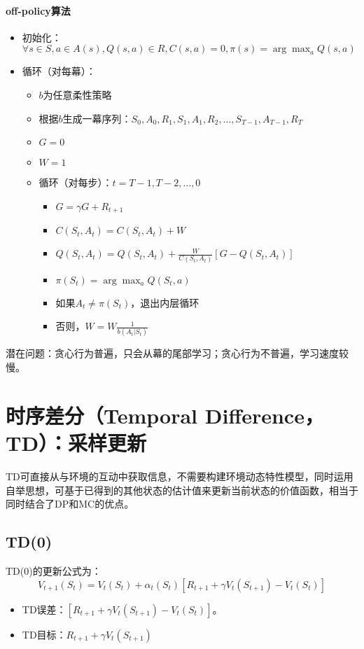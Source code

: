 \documentclass[
12pt, %
a4paper, 
oneside, %
headinclude,footinclude, %
]{scrartcl}
\begin{document}
\paragraph{off-policy算法}
\begin{itemize}
\item 初始化：$ \forall s \in S, a \in A(s), Q(s,a) \in R, C(s,a) = 0, \pi(s) = \arg \max_a Q(s,a) $
\item 循环（对每幕）：
\begin{itemize}
\item $ b $为任意柔性策略
\item 根据$ b $生成一幕序列：$ S_0,A_0,R_1,S_1,A_1,R_2,\dots,S_{T - 1},A_{T - 1},R_T $
\item $ G = 0 $
\item $ W = 1 $
\item 循环（对每步）：$ t = T - 1, T - 2, \dots, 0 $
\begin{itemize}
\item $ G = \gamma G + R_{t + 1} $ 
\item $ C(S_t,A_t) = C(S_t,A_t) + W $
\item $ Q(S_t,A_t) = Q(S_t,A_t) + \frac{W}{C(S_t,A_t)}[G - Q(S_t,A_t)] $
\item $ \pi(S_t) = \arg \max_a Q(S_t,a) $
\item 如果$ A_t \neq \pi(S_t) $，退出内层循环
\item 否则，$ W = W\frac{1}{b(A_t|S_t)} $
\end{itemize}
\end{itemize}
\end{itemize}

潜在问题：贪心行为普遍，只会从幕的尾部学习；贪心行为不普遍，学习速度较慢。
\section{时序差分（Temporal Difference，TD）：采样更新}
TD可直接从与环境的互动中获取信息，不需要构建环境动态特性模型，同时运用自举思想，可基于已得到的其他状态的估计值来更新当前状态的价值函数，相当于同时结合了DP和MC的优点。
\subsection{TD(0)}
TD(0)的更新公式为：
$$
V_{t + 1}(S_t) = V_t(S_t) + \alpha_t(S_t)[R_{t + 1} + \gamma V_t(S_{t + 1}) - V_t(S_t)]
$$
\begin{itemize}
\item TD误差：$ [R_{t + 1} + \gamma V_t(S_{t + 1}) - V_t(S_t)] $。
\item TD目标：$ R_{t + 1} + \gamma V_t(S_{t + 1}) $
\end{itemize}
\end{document}
